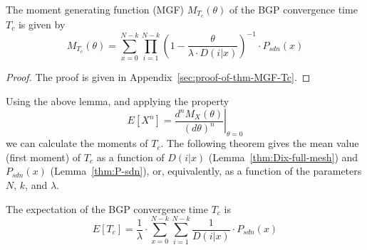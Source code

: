 

\begin{lemma}\label{thm:MGF-Tc}
The moment generating function (MGF) $M_{T_{c}}(\theta)$ of the BGP convergence time $T_{c}$ is given by
\begin{equation}
M_{T_{c}}(\theta) = \sum_{x=0}^{N-k}\prod_{i=1}^{N-k}\left(1-\frac{\theta}{\lambda\cdot D(i|x)}\right)^{-1} \cdot P_{sdn}(x)
\end{equation}
\end{lemma}
\begin{proof}
The proof is given in Appendix~\ref{sec:proof-of-thm-MGF-Tc}.
\end{proof}


Using the above lemma, and applying the property
\begin{equation}\label{eq:MGF-moments}
E[X^{n}] = \left. \frac{d^{n}M_{X}(\theta)}{(d\theta)^{n}}\right|_{\theta=0}
\end{equation}
we can calculate the moments of $T_{c}$. The following theorem gives the mean value (first moment) %
 of $T_{c}$ as a function of $D(i|x)$ (Lemma~\ref{thm:Dix-full-mesh}) and $P_{sdn}(x)$ (Lemma~\ref{thm:P-sdn}), or, equivalently, as a function of the parameters $N$, $k$, and $\lambda$. %
\begin{theorem}\label{thm:expectation-and-variance-Tc}
The expectation of the BGP convergence time $T_{c}$ is
\begin{equation}
E[T_{c}] = \frac{1}{\lambda}\cdot\sum_{x=0}^{N-k}\sum_{i=1}^{N-k}\frac{1}{ D(i|x)}\cdot P_{sdn}(x)
\end{equation}
\end{theorem}


